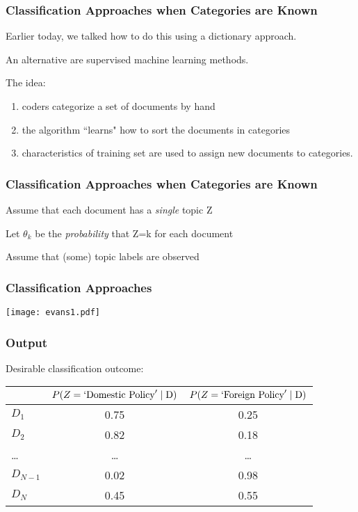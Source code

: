 \documentclass[11pt,compress,professionalfonts]{beamer}
\begin{document}
\begin{frame}[t,fragile]\frametitle{Classification Approaches when Categories are Known}

Earlier today, we talked how to do this using a dictionary approach.

An alternative are supervised machine learning methods.

The idea:

\begin{enumerate}

\item coders categorize a set of documents by hand
\item the algorithm ``learns" how to sort the documents in categories
\item  characteristics of training set are used  to assign new documents to categories.
\end{enumerate}


\end{frame}
\begin{frame}[t,fragile]\frametitle{Classification Approaches when Categories are Known}

Assume that each document has a \textit{single} topic Z

Let $\theta_k$ be the \textit{probability} that Z=k for each document

Assume that (some) topic labels are observed






\end{frame}
\begin{frame}[t,fragile]\frametitle{Classification Approaches}

\centerline{\texttt{[image: evans1.pdf]}}

\end{frame}
\begin{frame}[t,fragile]\frametitle{Output}

Desirable classification outcome:

\begin{center}
\begin{tabular}{lcc}
& $P(Z=`\text{Domestic Policy}'\mid \text D)$ & $P(Z=`\text{Foreign Policy}' \mid \text D)$ \\ \toprule
$D_1$ & 0.75 & 0.25 \\
$D_2$ & 0.82 & 0.18 \\
\ldots & \ldots & \ldots\\
$D_{N-1}$ & 0.02 & 0.98 \\
$D_N$ & 0.45 & 0.55\\ \bottomrule
\end{tabular}
\end{center}

\end{frame}
\end{document}
